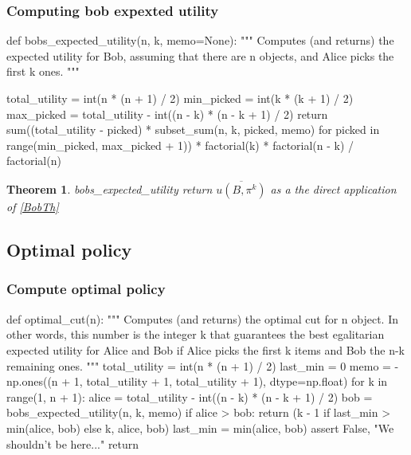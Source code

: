 \documentclass[a4paper, english, 10pt]{article}
\newtheorem{theorem}{Theorem}
\begin{document}
\subsubsection{Computing bob expexted utility}

	\begin{customFrame}
	def bobs_expected_utility(n, k, memo=None):
	"""
	Computes (and returns) the expected utility for Bob, assuming
	that there are n objects, and Alice picks the first k ones.
	"""
	
	total_utility = int(n * (n + 1) / 2)
	min_picked = int(k * (k + 1) / 2)
	max_picked = total_utility - int((n - k) * (n - k + 1) / 2)
	return sum((total_utility - picked) * subset_sum(n, k, picked, memo)
	for picked in range(min_picked, max_picked + 1)) * factorial(k) * factorial(n - k) / factorial(n)		
	\end{customFrame}
\label{BobComp}
\begin{theorem}
	bobs\_expected\_utility return $ \overline{u(B, \pi^k)} $ as a the direct application of \ref{BobTh}
\end{theorem}

\subsection{Optimal policy}

\subsubsection{Compute optimal policy}

	\begin{customFrame}
	def optimal_cut(n):
	"""
	Computes (and returns) the optimal cut for n object. In other words,
	this number is the integer k that guarantees the best egalitarian expected
	utility for Alice and Bob if Alice picks the first k items and Bob the n-k
	remaining ones.
	"""
	total_utility = int(n * (n + 1) / 2)
	last_min = 0
	memo = -np.ones((n + 1, total_utility + 1, total_utility + 1), dtype=np.float)
	for k in range(1, n + 1):
	alice = total_utility - int((n - k) * (n - k + 1) / 2)
	bob = bobs_expected_utility(n, k, memo)
	if alice > bob:
	return (k - 1 if last_min > min(alice, bob) else k,
	alice, bob)
	last_min = min(alice, bob)
	assert False, "We shouldn't be here..."
	return	
\end{customFrame}
\end{document}
